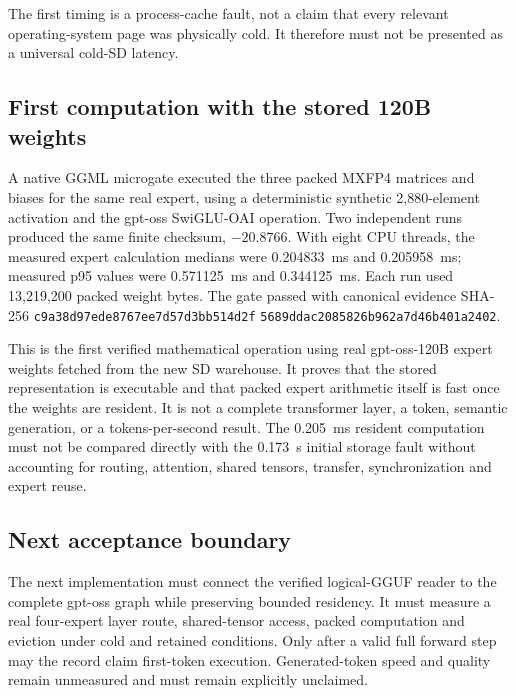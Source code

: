 The first timing is a process-cache fault, not a claim that every relevant
operating-system page was physically cold.  It therefore must not be presented
as a universal cold-SD latency.

\subsection{First computation with the stored 120B weights}

A native GGML microgate executed the three packed MXFP4 matrices and biases for
the same real expert, using a deterministic synthetic 2,880-element activation
and the gpt-oss SwiGLU-OAI operation.  Two independent runs produced the same
finite checksum, $-20.8766$.  With eight CPU threads, the measured expert
calculation medians were 0.204833~ms and 0.205958~ms; measured p95 values were
0.571125~ms and 0.344125~ms.  Each run used 13,219,200 packed weight bytes.
The gate passed with canonical evidence SHA-256
\texttt{c9a38d97ede8767ee7d57d3bb514d2f}%
\allowbreak\texttt{5689ddac2085826b962a7d46b401a2402}.

This is the first verified mathematical operation using real gpt-oss-120B
expert weights fetched from the new SD warehouse.  It proves that the stored
representation is executable and that packed expert arithmetic itself is fast
once the weights are resident.  It is not a complete transformer layer, a
token, semantic generation, or a tokens-per-second result.  The 0.205~ms
resident computation must not be compared directly with the 0.173~s initial
storage fault without accounting for routing, attention, shared tensors,
transfer, synchronization and expert reuse.

\subsection{Next acceptance boundary}

The next implementation must connect the verified logical-GGUF reader to the
complete gpt-oss graph while preserving bounded residency.  It must measure a
real four-expert layer route, shared-tensor access, packed computation and
eviction under cold and retained conditions.  Only after a valid full forward
step may the record claim first-token execution.  Generated-token speed and
quality remain unmeasured and must remain explicitly unclaimed.
\endgroup
